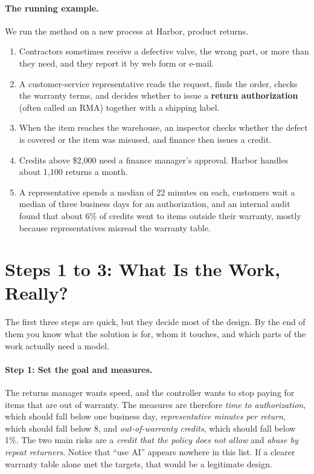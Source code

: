 \paragraph{The running example.} We run the method on a new process at Harbor, product returns. 
\begin{enumerate}
\item Contractors sometimes receive a defective valve, the wrong part, or more than they need, and they report it by web form or e-mail. 
\item A customer-service representative reads the request, finds the order, checks the warranty terms, and decides whether to issue a \textbf{return authorization} (often called an RMA) together with a shipping label. 
\item When the item reaches the warehouse, an inspector checks whether the defect is covered or the item was misused, and finance then issues a credit. 
\item Credits above \$2{,}000 need a finance manager's approval. Harbor handles about 1{,}100 returns a month. 
\item A representative spends a median of 22 minutes on each, customers wait a median of three business days for an authorization, and an internal audit found that about 6\% of credits went to items outside their warranty, mostly because representatives misread the warranty table.
\end{enumerate}
\section{Steps 1 to 3: What Is the Work, Really?}
\label{sec:understand}

The first three steps are quick, but they decide most of the design. By the end of them you know what the solution is for, whom it touches, and which parts of the work actually need a model.

\paragraph{Step 1: Set the goal and measures.} The returns manager wants speed, and the controller wants to stop paying for items that are out of warranty. The measures are therefore \emph{time to authorization}, which should fall below one business day, \emph{representative minutes per return}, which should fall below 8, and \emph{out-of-warranty credits}, which should fall below 1\%. The two main risks are a \emph{credit that the policy does not allow} and \emph{abuse by repeat returners}. Notice that ``use AI'' appears nowhere in this list. If a clearer warranty table alone met the targets, that would be a legitimate design.

